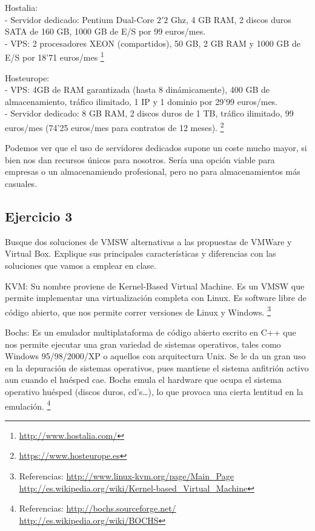 \documentclass[a4paper, 11pt]{article} %
\begin{document}
Hostalia: \\
- Servidor dedicado: Pentium Dual-Core $2'2$ Ghz, 4 GB RAM, 2 discos duros SATA de 160 GB, 1000 GB de E/S por 99 euros/mes. \\
- VPS: 2 procesadores XEON (compartidos), 50 GB, 2 GB RAM y 1000 GB de E/S por 18'71 euros/mes
\footnote{\url{http://www.hostalia.com/}}

Hosteurope: \\
- VPS: 4GB de RAM garantizada (hasta 8 dinámicamente), 400 GB de almacenamiento, tráfico ilimitado, 1 IP y 1 dominio por 29'99 euros/mes.\\
- Servidor dedicado: 8 GB RAM, 2 discos duros de 1 TB, tráfico ilimitado, 99 euros/mes (74'25 euros/mes para contratos de 12 meses). 
\footnote{\url{https://www.hosteurope.es}}

Podemos ver que el uso de servidores dedicados supone un coste mucho mayor, si bien nos dan recursos únicos para nosotros. Sería una opción viable para empresas o un almacenamiendo profesional, pero no para almacenamientos más casuales. 

\subsection*{Ejercicio 3}
Busque dos soluciones de VMSW alternativas a las propuestas de VMWare
y Virtual Box. Explique sus principales características y diferencias con las soluciones
que vamos a emplear en clase.

KVM: Su nombre proviene de Kernel-Based Virtual Machine. Es un VMSW que permite implementar una virtualización completa con Linux. 
Es software libre de código abierto, que nos permite correr versiones de Linux y Windows.
\footnote{Referencias: \url{http://www.linux-kvm.org/page/Main_Page} \\ \url{http://es.wikipedia.org/wiki/Kernel-based_Virtual_Machine}}

Bochs: Es un emulador multiplataforma de código abierto escrito en C++ que nos permite ejecutar una gran variedad de sistemas operativos, tales como Windows 95/98/2000/XP o aquellos con arquitectura Unix. Se le da un gran uso en la depuración de sistemas operativos, pues mantiene el sistema anfitrión activo aun cuando el huésped cae. Bochs emula el hardware que ocupa el sistema operativo huésped (discos duros, cd's\dots), lo que provoca una cierta lentitud en la emulación. 
\footnote{Referencias: \url{http://bochs.sourceforge.net/} \\ \url{http://es.wikipedia.org/wiki/BOCHS}}
\end{document}
